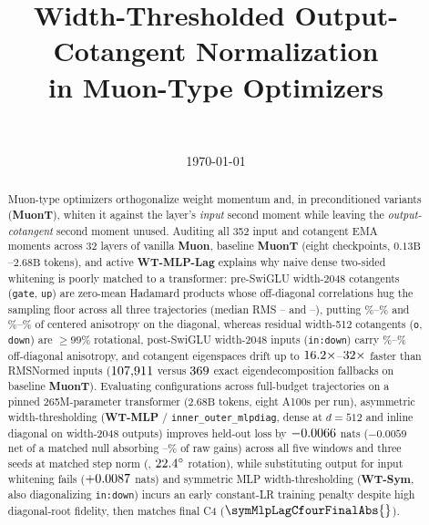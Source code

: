 \documentclass[11pt]{article}
\title{\textbf{Width-Thresholded Output-Cotangent Normalization\\in Muon-Type Optimizers}}
\author{\todo{authors}\\[3pt]{\small \todo{affiliations}}}
\date{\small \today}
\newcommand*{\pagesfsb}{\sffamily\bfseries}
\newcommand{\taxid}[1]{{\pagesfsb #1}}
\newcommand{\mlpdiag}{\texttt{inner\_outer\_mlpdiag}}
\begin{document}
\maketitle

\begin{abstract}
Muon-type optimizers orthogonalize weight momentum and, in preconditioned
variants (\taxid{MuonT}), whiten it against the layer's \emph{input} second
moment while leaving the \emph{output-cotangent} second moment unused. Auditing
all 352 input and cotangent EMA moments across 32 layers of vanilla
\taxid{Muon}, baseline \taxid{MuonT} (eight checkpoints,
$0.13\text{B}$--$2.68\text{B}$ tokens), and active \taxid{WT-MLP-Lag} explains
why naive dense two-sided whitening is poorly matched to a transformer:
pre-SwiGLU width-2048 cotangents (\texttt{gate}, \texttt{up}) are zero-mean
Hadamard products whose off-diagonal correlations hug the sampling floor across
all three trajectories (median RMS
\motWtOutGateCorrRmsMed{}--\motMuonOutGateCorrRmsMed{} and
\motMuonOutUpCorrRmsMed{}--\motWtOutUpCorrRmsMed{}), putting
\motMuonOutGateDiagAnisoMedPct\%--\motWtOutGateDiagAnisoMedPct\% and
\motMuonOutUpDiagAnisoMedPct\%--\motWtOutUpDiagAnisoMedPct\% of centered
anisotropy on the diagonal, whereas residual width-512 cotangents (\texttt{o},
\texttt{down}) are $\ge 99\%$ rotational, post-SwiGLU width-2048 inputs
(\texttt{in:down}) carry
\motInDownOffdiagAnisoMedPct\%--\motMuonInDownOffdiagAnisoMedPct\% off-diagonal
anisotropy, and cotangent eigenspaces drift up to
$16.2\times$--$32\times$
faster than RMSNormed inputs ($107{,}911{}$ versus $369{}$ exact
eigendecomposition fallbacks on baseline \taxid{MuonT}).
Evaluating \nOptimizerArms{} configurations across \nDistinctRuns{} full-budget
trajectories on a pinned 265M-parameter transformer ($2.68\text{B}$ tokens, eight
A100s per run), asymmetric width-thresholding (\taxid{WT-MLP} / \mlpdiag{}, dense
at $d=512$ and inline diagonal on width-2048 outputs) improves held-out loss by
$-0.0066{}$ nats ($-0.0059$ net of a matched null absorbing
\nullsharedense--\nullsharemlpcfour\% of raw gains) across all five windows and
three seeds at matched step norm (\mechMlpdiagGraftNorm{}, $22.4^\circ$
rotation), while substituting output for input whitening fails ($+0.0087{}$
nats) and symmetric MLP width-thresholding (\taxid{WT-Sym}, also diagonalizing
\texttt{in:down}) incurs an early constant-LR training penalty despite high
diagonal-root fidelity, then matches final C4 ($\symMlpLagCfourFinalAbs{}$).

\end{abstract}
\end{document}

